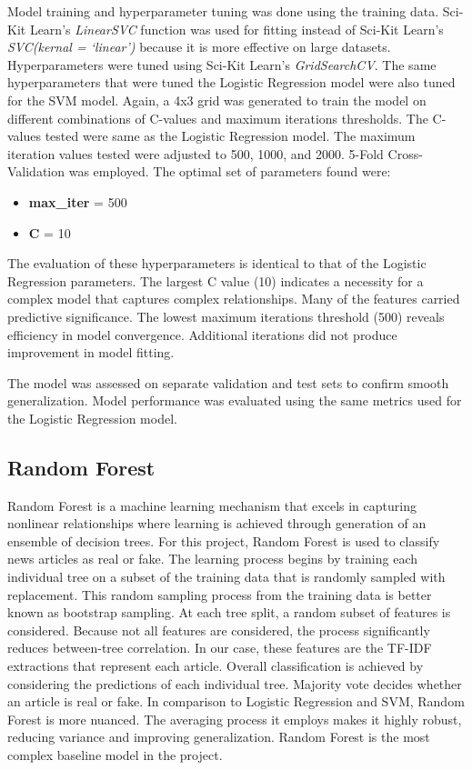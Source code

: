 \documentclass{article}
\begin{document}
Model training and hyperparameter tuning was done using the training data. Sci-Kit Learn's {\it LinearSVC} function was used for fitting instead of Sci-Kit Learn's {\it SVC(kernal = ‘linear’)} because it is more effective on large datasets. Hyperparameters were tuned using Sci-Kit Learn’s {\it GridSearchCV}. The same hyperparameters that were tuned the Logistic Regression model were also tuned for the SVM model. Again, a 4x3 grid was generated to train the model on different combinations of C-values and maximum iterations thresholds. The C-values tested were same as the Logistic Regression model. The maximum iteration values tested were adjusted to 500, 1000, and 2000. 5-Fold Cross-Validation was employed. The optimal set of parameters found were:

\begin{itemize}
    \item \textbf{max\_iter} = 500

    \item \textbf{C} = 10
    
\end{itemize}

The evaluation of these hyperparameters is identical to that of the Logistic Regression parameters. The largest C value (10) indicates a necessity for a complex model that captures complex relationships. Many of the features carried predictive significance. The lowest maximum iterations threshold (500) reveals efficiency in model convergence. Additional iterations did not produce improvement in model fitting. 

The model was assessed on separate validation and test sets to confirm smooth generalization. Model performance was evaluated using the same metrics used for the Logistic Regression model. 

\subsection{Random Forest}
Random Forest is a machine learning mechanism that excels in capturing nonlinear relationships where learning is achieved through generation of an ensemble of decision trees. For this project, Random Forest is used to classify news articles as real or fake. The learning process begins by training each individual tree on a subset of the training data that is randomly sampled with replacement. This random sampling process from the training data is better known as bootstrap sampling. At each tree split, a random subset of features is considered. Because not all features are considered, the process significantly reduces between-tree correlation. In our case, these features are the TF-IDF extractions that represent each article. Overall classification is achieved by considering the predictions of each individual tree. Majority vote decides whether an article is real or fake. In comparison to Logistic Regression and SVM, Random Forest is more nuanced. The averaging process it employs makes it highly robust, reducing variance and improving generalization. Random Forest is the most complex baseline model in the project. 
\end{document}
